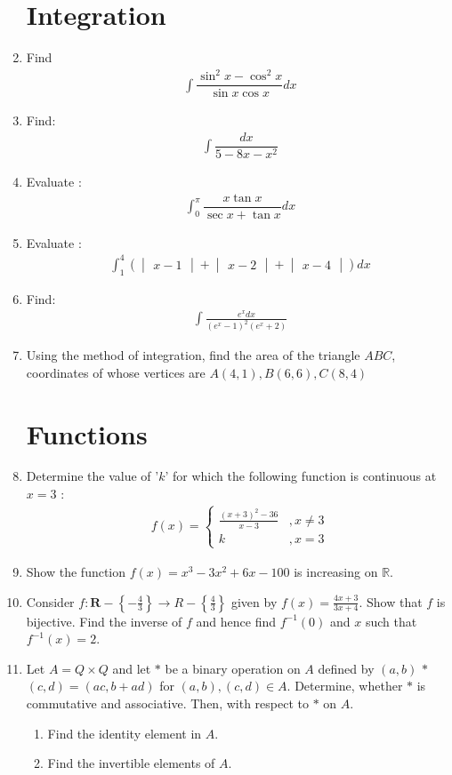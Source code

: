 \documentclass[10pt,-letter paper]{article}
\let\vec\mathbf{}
\let\vec\mathbf{}
\providecommand{\cbrak}[1]{\ensuremath{\left\{#1\right\}}}
\providecommand{\brak}[1]{\ensuremath{\left(#1\right)}}
\newcommand{\mydet}[1]{\ensuremath{\begin{vmatrix}#1\end{vmatrix}}}
\providecommand{\mydet}[1]{\ensuremath{\begin{vmatrix}#1\end{vmatrix}}}
\begin{document}
\begin{enumerate}
\section{Integration}
\item Find
\begin{align*} 
\int \dfrac{{\sin}^{2} x-{\cos}^{2} x}{\sin x\cos x}dx
\end{align*}
\item Find:
\begin{align*} 
\int\dfrac{dx}{5-8{x}-{x}^{2}}
\end{align*}
\item Evaluate :	
\begin{align*}
\int_{0}^{\pi} \dfrac{x\tan x}{\sec x+\tan x}dx 
\end{align*}
\item Evaluate :
\begin{align*}
\int_{1}^{4}\brak{\mydet{x-1}+\mydet{x-2}+\mydet{x-4}}dx
\end{align*}
\item Find:
\begin{align*}
\int \frac{{e}^{x}dx}{{{\brak{{{e}^{x}-1}}^{2}}{\brak{{e}^{x}+2}}}}
\end{align*}
\item Using the method of integration, find the area of the triangle $ABC$, coordinates of whose vertices are $A\brak{4,1}, B\brak{6,6}, C\brak{8,4}$
\section{Functions}
\item Determine the value of '$k$' for which the following function is continuous at $x=3$ :
\begin{align*}
f\brak{x}=\left\{\begin{array}{cc}
\frac{(x+3)^2-36}{x-3} & , x \neq 3 \\k & , x=3
\end{array}\right.  
\end{align*}
\item Show the function $f\brak{x} = {x}^{3} -3{x}^{2}+6x-100$ is increasing on $\mathbb
{R}$.
\item Consider $f:\vec{R}-\cbrak{{-\frac{4}{3}}} \rightarrow R-\cbrak{\frac{4}{3}}$ given by $f\brak{x}=\frac{4x+3}{3x+4}$. Show that $f$ is bijective. Find the inverse of $f$ and hence find ${f}^{-1}\brak{0}$ and $x$ such that ${f}^{-1}\brak{x}=2$.
\item Let $A = {Q}\times{Q}$ and let $\ast$ be  a binary operation on $A$ defined by $\brak{a, b}$  $\ast$  $\brak {c, d} = \brak{{a}{c}, b+{a}{d}}$ for $\brak{a, b}, \brak {c, d} \in A$. Determine, whether $\ast$ is commutative and associative. Then, with respect to $\ast$ on $A$.
\begin{enumerate}[label = (\roman*)]
\item Find the identity element in $A$.
\item Find the invertible elements of $A$.
\end{enumerate}

\end{enumerate}
\end{document}
